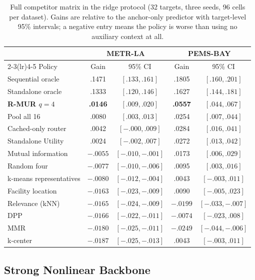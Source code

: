 \begin{table}[t]
 \centering
 \footnotesize
 \caption{Full competitor matrix in the ridge protocol (32 targets, three
 seeds, 96 cells per dataset). Gains are relative to the anchor-only predictor
 with target-level 95\% intervals; a negative entry means the policy is worse
 than using no auxiliary context at all.}
 \label{tab:ridge-matrix}
 \begin{tabular}{lcccc}
  \toprule
  & \multicolumn{2}{c}{METR-LA} & \multicolumn{2}{c}{PEMS-BAY}\\
  \cmidrule(lr){2-3}\cmidrule(lr){4-5}
  Policy & Gain & 95\% CI & Gain & 95\% CI\\
  \midrule
  Sequential oracle & .1471 & $[.133,.161]$ & .1805 & $[.160,.201]$\\
  Standalone oracle & .1333 & $[.120,.146]$ & .1627 & $[.144,.181]$\\
  \textbf{R-MUR $q{=}4$} & \textbf{.0146} & $[.009,.020]$ & \textbf{.0557} & $[.044,.067]$\\
  Pool all 16 & .0080 & $[.003,.013]$ & .0254 & $[.007,.044]$\\
  Cached-only router & .0042 & $[-.000,.009]$ & .0284 & $[.016,.041]$\\
  Standalone Utility & .0024 & $[-.002,.007]$ & .0272 & $[.013,.042]$\\
  Mutual information & $-.0055$ & $[-.010,-.001]$ & .0173 & $[.006,.029]$\\
  Random four & $-.0077$ & $[-.010,-.006]$ & .0095 & $[.003,.016]$\\
  k-means representatives & $-.0080$ & $[-.012,-.004]$ & .0043 & $[-.003,.011]$\\
  Facility location & $-.0163$ & $[-.023,-.009]$ & .0090 & $[-.005,.023]$\\
  Relevance (kNN) & $-.0165$ & $[-.024,-.009]$ & $-.0199$ & $[-.033,-.007]$\\
  DPP & $-.0166$ & $[-.022,-.011]$ & $-.0074$ & $[-.023,.008]$\\
  MMR & $-.0180$ & $[-.025,-.011]$ & $-.0249$ & $[-.044,-.006]$\\
  k-center & $-.0187$ & $[-.025,-.013]$ & .0043 & $[-.003,.011]$\\
  \bottomrule \end{tabular}
\end{table}

\subsection{Strong Nonlinear Backbone}
\label{sec:strong-backbone}


